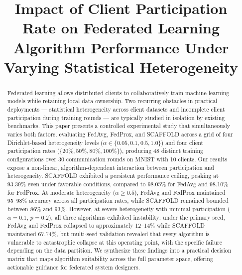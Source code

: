 \documentclass[conference]{IEEEtran}
\begin{document}
\title{Impact of Client Participation Rate on Federated Learning Algorithm Performance Under Varying Statistical Heterogeneity}

\author{
}

\maketitle

\begin{abstract}
Federated learning allows distributed clients to collaboratively train machine learning models while retaining local data ownership. Two recurring obstacles in practical deployments --- statistical heterogeneity across client datasets and incomplete client participation during training rounds --- are typically studied in isolation by existing benchmarks. This paper presents a controlled experimental study that simultaneously varies both factors, evaluating FedAvg, FedProx, and SCAFFOLD across a grid of four Dirichlet-based heterogeneity levels ($\alpha \in \{0.05, 0.1, 0.5, 1.0\}$) and four client participation rates ($\{20\%, 50\%, 80\%, 100\%\}$), producing 48 distinct training configurations over 30 communication rounds on MNIST with 10 clients. Our results expose a non-linear, algorithm-dependent interaction between participation and heterogeneity. SCAFFOLD exhibited a persistent performance ceiling, peaking at 93.39\% even under favorable conditions, compared to 98.05\% for FedAvg and 98.10\% for FedProx. At moderate heterogeneity ($\alpha \geq 0.5$), FedAvg and FedProx maintained 95--98\% accuracy across all participation rates, while SCAFFOLD remained bounded between 86\% and 93\%. However, at severe heterogeneity with minimal participation ($\alpha = 0.1$, $p = 0.2$), all three algorithms exhibited instability: under the primary seed, FedAvg and FedProx collapsed to approximately 12--14\% while SCAFFOLD maintained 67.74\%, but multi-seed validation revealed that every algorithm is vulnerable to catastrophic collapse at this operating point, with the specific failure depending on the data partition. We synthesize these findings into a practical decision matrix that maps algorithm suitability across the full parameter space, offering actionable guidance for federated system designers.
\end{abstract}
\end{document}
